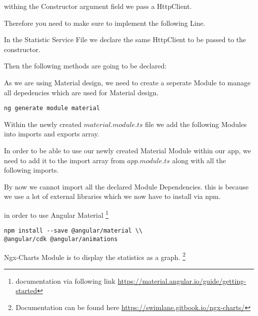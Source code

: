 withing the Constructor argument field we pass a HttpClient.


Therefore you need to make sure to implement the following Line.

\newpage


In the Statistic Service File we declare the same HttpClient to be passed to the constructor.


Then the following methods are going to be declared:


As we are using Material design, we need to create a seperate Module to manage all depedencies which are used for Material design.

\begin{verbatim}
ng generate module material
\end{verbatim}
Within the newly created $material.module.ts$ file we add the following Modules into imports and exports array.

In order to be able to use our newly created Material Module within our app, we need to add it to the import array from $app.module.ts$ along with all the following imports.

   
By now we cannot import all the declared Module Dependencies. this is because we use a lot of external libraries which we now have to install via npm.

in order to use Angular Material \footnote{documentation via following link \url{https://material.angular.io/guide/getting-started}}
\begin{verbatim}
npm install --save @angular/material \\
@angular/cdk @angular/animations 
\end{verbatim}
\newpage
Ngx-Charts Module is to display the statistics as a graph.
\footnote{Documentation can be found here \url{https://swimlane.gitbook.io/ngx-charts/}}


